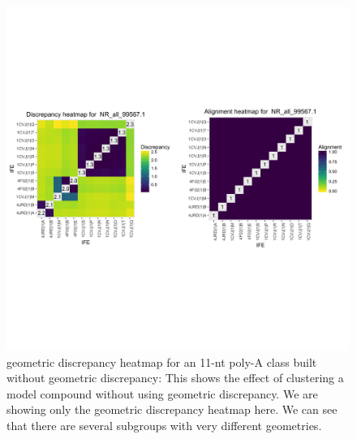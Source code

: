 \begin{figure}[h]
  \includegraphics[width=\textwidth]{chapter-3/figs/small-aa-no-disc}
  \caption{geometric discrepancy heatmap for an 11-nt poly-A class built without
    geometric discrepancy: This shows the effect of clustering a model compound without
    using geometric discrepancy. We are showing only the geometric discrepancy heatmap here. We can
  see that there are several subgroups with very different geometries.}
\label{fig:small-aa-no-disc}
\end{figure}

